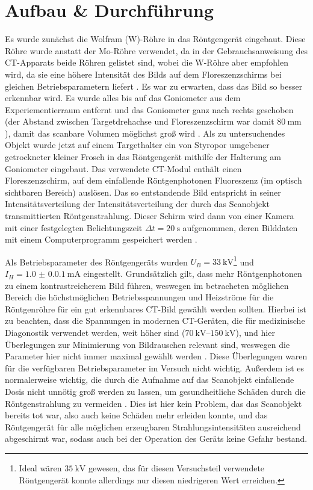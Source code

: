 \section{Aufbau \& Durchführung}

Es wurde zunächst die Wolfram (W)-Röhre in das Röntgengerät eingebaut. Diese Röhre wurde anstatt der Mo-Röhre verwendet, da in der Gebrauchsanweisung des CT-Apparats beide Röhren gelistet sind, wobei die W-Röhre aber empfohlen wird, da sie eine höhere Intensität des Bilds auf dem Floreszenzschirms bei gleichen Betriebsparametern liefert \cite[2]{LDctmodul}. Es war zu erwarten, dass das Bild so besser erkennbar wird. Es wurde alles bis auf das Goniometer aus dem Experiementierraum entfernt und das Goniometer ganz nach rechts geschoben (der Abstand zwischen Targetdrehachse und Floreszenzschirm war damit $\SI{80}{\milli\meter}$ \cite[3]{LDctmodul}), damit das scanbare Volumen möglichst groß wird \cite[3]{LDctmodul}. Als zu untersuchendes Objekt wurde jetzt auf einem Targethalter ein von Styropor umgebener getrockneter kleiner Frosch in das Röntgengerät mithilfe der Halterung am Goniometer eingebaut. Das verwendete CT-Modul enthält einen Floreszenzschirm, auf dem einfallende Röntgenphotonen Fluoreszenz (im optisch sichtbaren Bereich) auslösen. Das so entstandende Bild entspricht in seiner Intensitätsverteilung der Intensitätsverteilung der durch das Scanobjekt transmittierten Röntgenstrahlung. Dieser Schirm wird dann von einer Kamera mit einer festgelegten Belichtungszeit $\Delta t=\SI{20}{\s}$ aufgenommen, deren Bilddaten mit einem Computerprogramm gespeichert werden \cite[3]{LDctmodul}.

Als Betriebsparameter des Röntgengeräts wurden $U_B = \SI{33}{\kilo\V}$\footnote{Ideal wären $\SI{35}{\kilo\volt}$ gewesen, das für diesen Versuchsteil verwendete Röntgengerät konnte allerdings nur diesen niedrigeren Wert erreichen.} und $I_H = \SI{1.0(0.01)}{\milli\ampere}$ eingestellt. Grundsätzlich gilt, dass mehr Röntgenphotonen zu einem kontrastreicherem Bild führen, weswegen im betracheten möglichen Bereich die höchstmöglichen Betriebsspannungen und Heizströme für die Röntgenröhre für ein gut erkennbares CT-Bild gewählt werden sollten. Hierbei ist zu beachten, dass die Spannungen in modernen CT-Geräten, die für medizinische Diagonostik verwendet werden, weit höher sind ($\SIrange{70}{150}{\kilo\volt}$), und hier Überlegungen zur Minimierung von Bildrauschen relevant sind, weswegen die Parameter hier nicht immer maximal gewählt werden \cite[176-177]{medizinphysik}. Diese Überlegungen waren für die verfügbaren Betriebsparameter im Versuch nicht wichtig. Außerdem ist es normalerweise wichtig, die durch die Aufnahme auf das Scanobjekt einfallende Dosis nicht unnötig groß werden zu lassen, um gesundheitliche Schäden durch die Röntgenstrahlung zu vermeiden \cite[182]{medizinphysik}. Dies ist hier kein Problem, das das Scanobjekt bereits tot war, also auch keine Schäden mehr erleiden konnte, und das Röntgengerät für alle möglichen erzeugbaren Strahlungsintensitäten ausreichend abgeschirmt war, sodass auch bei der Operation des Geräts keine Gefahr bestand.

